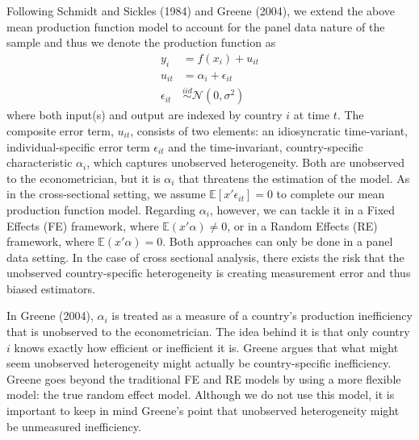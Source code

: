 \documentclass[12pt,a4paper]{article}\usepackage[]{graphicx}\usepackage[]{color}
\begin{document}
Following Schmidt and Sickles (1984) and Greene (2004), we extend the above mean production function model to account for the panel data nature of the sample and thus we denote the production function as
$$
\begin{aligned}
y_i & = f(x_i) + u_{it} \\
u_{it} & = \alpha_i + \epsilon_{it} \\
\epsilon_{it} & \overset{iid}{\sim} \mathcal{N}(0, \sigma ^2)
\end{aligned}
$$
where both input(s) and output are indexed by country $i$ at time $t$. The composite error term, $u_{it}$, consists of two elements: an idiosyncratic time-variant, individual-specific error term $\epsilon_{it}$ and the time-invariant, country-specific characteristic $\alpha_i$, which captures unobserved heterogeneity. Both are unobserved to the econometrician, but it is $\alpha_i$ that threatens the estimation of the model. As in the cross-sectional setting, we assume $\mathbb{E}[x' \epsilon_{it}]=0$ to complete our mean production function model. Regarding $\alpha_i$, however, we can tackle it in a Fixed Effects (FE) framework, where $\mathbb{E}(x' \alpha) \neq 0$, or in a Random Effects (RE) framework, where $\mathbb{E}(x' \alpha) = 0$. Both approaches can only be done in a panel data setting. In the case of cross sectional analysis, there exists the risk that the unobserved country-specific heterogeneity is creating measurement error and thus biased estimators. 

In Greene (2004), $\alpha_i$ is treated as a measure of a country's production inefficiency that is unobserved to the econometrician. The idea behind it is that only country $i$ knows exactly how efficient or inefficient it is. Greene argues that what might seem unobserved heterogeneity might actually be country-specific inefficiency. Greene goes beyond the traditional FE and RE models by using a more flexible model: the true random effect model. Although we do not use this model, it is important to keep in mind Greene's point that unobserved heterogeneity might be unmeasured inefficiency.
\end{document}
